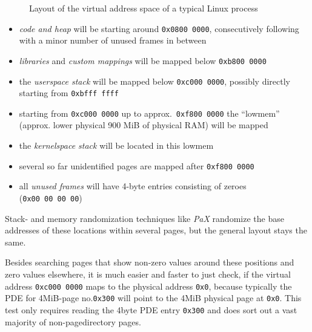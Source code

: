 \begin{figure}[ht] \begin{center}

	\epsfysize 7.5cm


	\caption{Layout of the virtual address space of a typical Linux process}

	\label{fig:linux_virtual_address_space}

\end{center}\end{figure}


\begin{itemize}

	\item \emph{code and heap} will be starting around \texttt{0x0800~0000},
	consecutively following with a minor number of unused frames in between

	\item \emph{libraries} and \emph{custom mappings} will be mapped below
	\texttt{0xb800~0000}

	\item the \emph{userspace stack} will be mapped below \texttt{0xc000~0000},
	possibly directly starting from \texttt{0xbfff~ffff}

	\item starting from \texttt{0xc000~0000} up to approx.~\texttt{0xf800~0000}
	the ``lowmem'' (approx. lower physical 900 MiB of physical RAM) will be mapped

	\item the \emph{kernelspace stack} will be located in this lowmem

	\item several so far unidentified pages are mapped after
	\texttt{0xf800~0000}

	\item all \emph{unused frames} will have 4-byte entries consisting of
	zeroes (\texttt{0x00~00~00~00})

\end{itemize}

Stack- and memory randomization techniques like \emph{PaX} randomize the base
addresses of these locations within several pages, but the general layout stays
the same.

Besides searching pages that show non-zero values around these positions and
zero values elsewhere, it is much easier and faster to just check, if the
virtual address \texttt{0xc000~0000} maps to the physical address \texttt{0x0},
because typically the PDE for 4MiB-page no.\@ \texttt{0x300} will point to the
4MiB physical page at \texttt{0x0}. This test only requires reading the 4byte
PDE entry \texttt{0x300} and does sort out a vast majority of non-pagedirectory
pages.

